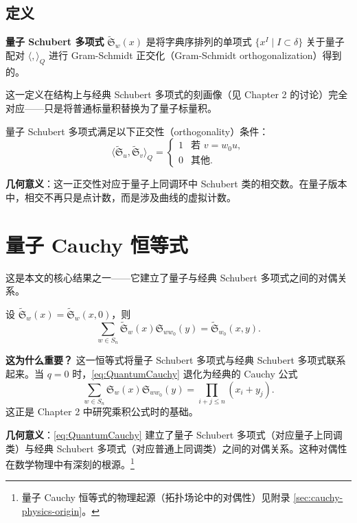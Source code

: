 \subsection{定义}

\begin{Definition}
\label{def:QuantumSchubert}
\textbf{量子 Schubert 多项式} $\widetilde{\mathfrak{S}}_w(x)$ 是将字典序排列的单项式 $\{x^I \mid I \subset \delta\}$ 关于量子配对 $\langle, \rangle_Q$ 进行 Gram-Schmidt 正交化（Gram-Schmidt orthogonalization）得到的。
\end{Definition}

这一定义在结构上与经典 Schubert 多项式的刻画像（见 Chapter 2 的讨论）完全对应——只是将普通标量积替换为了量子标量积。

量子 Schubert 多项式满足以下正交性（orthogonality）条件：
\[
\langle \widetilde{\mathfrak{S}}_u, \widetilde{\mathfrak{S}}_v \rangle_Q = \begin{cases}
1 & \text{若 } v = w_0 u, \\
0 & \text{其他}.
\end{cases}
\label{eq:QuantumSchubertOrthogonality}
\]

\textbf{几何意义}：这一正交性对应于量子上同调环中 Schubert 类的相交数。在量子版本中，相交不再只是点计数，而是涉及曲线的虚拟计数。

\section{量子 Cauchy 恒等式}
\label{sec:QuantumCauchy}

这是本文的核心结果之一——它建立了量子与经典 Schubert 多项式之间的对偶关系。

\begin{Theorem}
\label{th:QuantumCauchy}
设 $\widetilde{\mathfrak{S}}_w(x) = \widetilde{\mathfrak{S}}_w(x,0)$，则
\[
\sum_{w \in S_n} \widetilde{\mathfrak{S}}_w(x) \mathfrak{S}_{ww_0}(y) = \widetilde{\mathfrak{S}}_{w_0}(x,y).
\label{eq:QuantumCauchy}
\]
\end{Theorem}

\textbf{这为什么重要？} 这一恒等式将量子 Schubert 多项式与经典 Schubert 多项式联系起来。当 $q = 0$ 时，\eqref{eq:QuantumCauchy} 退化为经典的 Cauchy 公式
\[
\sum_{w \in S_n} \mathfrak{S}_w(x) \mathfrak{S}_{ww_0}(y) = \prod_{i+j \leq n}(x_i + y_j).
\label{eq:ClassicalCauchy}
\]
这正是 Chapter 2 中研究乘积公式时的基础。

\textbf{几何意义}：\eqref{eq:QuantumCauchy} 建立了量子 Schubert 多项式（对应量子上同调类）与经典 Schubert 多项式（对应普通上同调类）之间的对偶关系。这种对偶性在数学物理中有深刻的根源。\footnote{量子 Cauchy 恒等式的物理起源（拓扑场论中的对偶性）见附录 \cref{sec:cauchy-physics-origin}。}

